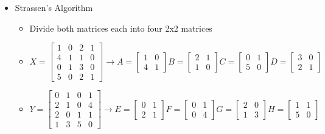 \documentclass{article}
\begin{document}
\begin{itemize}
 	\item Strassen's Algorithm
 		\begin{itemize}
 			\item Divide both matrices each into four 2x2 matrices
 			\item 
 				\[
 					X = 
 					\begin{bmatrix}
 					1 & 0 & 2 & 1 \\
 					4 & 1 & 1 & 0 \\
 					0 & 1 & 3 & 0 \\
 					5 & 0 & 2 & 1
 					\end{bmatrix}
 					\rightarrow A = 
 					\begin{bmatrix}
 					1 & 0 \\
 					4 & 1
 					\end{bmatrix}
 					B = 
 					\begin{bmatrix}
 					2 & 1 \\
 					1 & 0
 					\end{bmatrix}
 					C = 
 					\begin{bmatrix}
 					0 & 1 \\
 					5 & 0
 					\end{bmatrix}
 					D = 
 					\begin{bmatrix}
 					3 & 0 \\
 					2 & 1
 					\end{bmatrix}
 				\]
		\item 
			\[
				Y = 
				\begin{bmatrix}
				0 & 1 & 0 & 1 \\
				2 & 1 & 0 & 4 \\
				2 & 0 & 1 & 1 \\
				1 & 3 & 5 & 0
				\end{bmatrix}
				\rightarrow E = 
				\begin{bmatrix}
				0 & 1 \\
				2 & 1
				\end{bmatrix}
				F = 
				\begin{bmatrix}
				0 & 1 \\
				0 & 4
				\end{bmatrix}
				G = 
				\begin{bmatrix}
				2 & 0 \\
				1 & 3
				\end{bmatrix}
				H = 
				\begin{bmatrix}
				1 & 1 \\
				5 & 0

\end{bmatrix}\]
\end{itemize}
\end{itemize}
\end{document}
